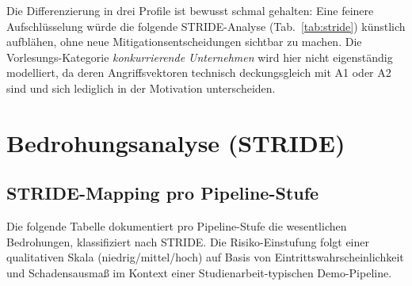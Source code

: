 \documentclass[12pt, a4paper]{scrartcl}
\begin{document}
Die Differenzierung in drei Profile ist bewusst schmal gehalten:
Eine feinere Aufschlüsselung würde die folgende STRIDE-Analyse
(Tab.~\ref{tab:stride}) künstlich aufblähen, ohne neue
Mitigationsentscheidungen sichtbar zu machen. Die Vorlesungs-Kategorie
\emph{konkurrierende Unternehmen} wird hier nicht eigenständig
modelliert, da deren Angriffsvektoren technisch deckungsgleich mit
A1 oder A2 sind und sich lediglich in der Motivation unterscheiden.

\section{Bedrohungsanalyse (STRIDE)}\label{sec:threatmodel}

\subsection{STRIDE-Mapping pro Pipeline-Stufe}
Die folgende Tabelle dokumentiert pro Pipeline-Stufe die wesentlichen
Bedrohungen, klassifiziert nach STRIDE. Die Risiko-Einstufung folgt einer
qualitativen Skala (niedrig/mittel/hoch) auf Basis von Eintrittswahrscheinlichkeit
und Schadensausmaß im Kontext einer Studienarbeit-typischen Demo-Pipeline.
\end{document}
